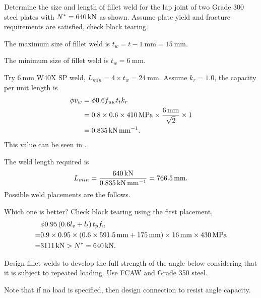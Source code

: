 \begin{exmp} Determine the size and length of fillet weld for the lap joint of two Grade 300 steel plates with $N^*=\SI{640}{\kilo\newton}$ as shown. Assume plate yield and fracture requirements are satisfied, check block tearing.
\begin{figure}[H]

\end{figure}
\end{exmp}
\begin{solution}
The maximum size of fillet weld is $t_w=t-\SI{1}{\mm}=\SI{15}{\mm}$.

The minimum size of fillet weld is $t_w=\SI{6}{\mm}$.

Try $\SI{6}{\mm}$ W40X SP weld, $L_{min}=4\times{}t_w=\SI{24}{\mm}$. Assume $k_r=1.0$, the capacity per unit length is
\begin{align*}
\phi{}v_w&=\phi{}0.6f_{uw}t_tk_r\\
&=0.8\times0.6\times\SI{410}{\mega\pascal}\times\dfrac{\SI{6}{\milli\meter}}{\sqrt{2}}\times1\\
&=\SI{0.835}{\kilo\newton\per\milli\meter}.
\end{align*}
This value can be seen in .

The weld length required is
\begin{gather*}
L_{min}=\dfrac{\SI{640}{\kilo\newton}}{\SI{0.835}{\kilo\newton\per\milli\meter}}=\SI{766.5}{\milli\meter}.
\end{gather*}
Possible weld placements are the follows.
\begin{figure}[H]
\centering

\end{figure}
Which one is better?
Check block tearing using the first placement,
\begin{align*}
&\phi0.95\left(0.6l_{v}+l_{t}\right)t_pf_u\\=&0.9\times0.95\times\left(0.6\times\SI{591.5}{\milli\meter}+\SI{175}{\milli\meter}\right)\times\SI{16}{\milli\meter}\times\SI{430}{\mega\pascal}
\\=&\SI{3111}{\kilo\newton}>N^*=\SI{640}{\kilo\newton}.
\end{align*}
\end{solution}
\begin{exmp}
Design fillet welds to develop the full strength of the angle below considering that it is subject to repeated loading. Use FCAW and Grade 350 steel.

Note that if no load is specified, then design connection to resist angle capacity.
\begin{figure}[H]

\end{figure}
\end{exmp}
